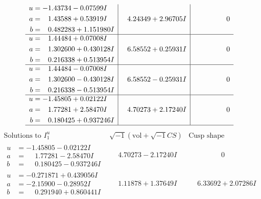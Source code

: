 \documentclass[1p]{elsarticle_modified}
\theoremstyle{definition}
\newcommand{\I}{\sqrt{-1}}
\begin{document}
$$\begin{array}{c|c|c}
\begin{aligned}
u &= -1.43734 - 0.07599 I \\
a &= \phantom{-}1.43588 + 0.53919 I \\
b &= \phantom{-}0.482283 + 1.151980 I\end{aligned}
 & \phantom{-}4.24349 + 2.96705 I & \phantom{-0.000000 } 0 \\ \hline\begin{aligned}
u &= \phantom{-}1.44484 + 0.07008 I \\
a &= \phantom{-}1.302600 + 0.430128 I \\
b &= \phantom{-}0.216338 + 0.513954 I\end{aligned}
 & \phantom{-}6.58552 + 0.25931 I & \phantom{-0.000000 } 0 \\ \hline\begin{aligned}
u &= \phantom{-}1.44484 - 0.07008 I \\
a &= \phantom{-}1.302600 - 0.430128 I \\
b &= \phantom{-}0.216338 - 0.513954 I\end{aligned}
 & \phantom{-}6.58552 - 0.25931 I & \phantom{-0.000000 } 0 \\ \hline\begin{aligned}
u &= -1.45805 + 0.02122 I \\
a &= \phantom{-}1.77281 + 2.58470 I \\
b &= \phantom{-}0.180425 + 0.937246 I\end{aligned}
 & \phantom{-}4.70273 + 2.17240 I & \phantom{-0.000000 } 0\\
 \hline 
 \end{array}$$\newpage$$\begin{array}{c|c|c}  
\text{Solutions to }I^u_{1}& \I (\text{vol} + \sqrt{-1}CS) & \text{Cusp shape}\\
 \hline 
\begin{aligned}
u &= -1.45805 - 0.02122 I \\
a &= \phantom{-}1.77281 - 2.58470 I \\
b &= \phantom{-}0.180425 - 0.937246 I\end{aligned}
 & \phantom{-}4.70273 - 2.17240 I & \phantom{-0.000000 } 0 \\ \hline\begin{aligned}
u &= -0.271871 + 0.439056 I \\
a &= -2.15900 - 0.28952 I \\
b &= \phantom{-}0.291940 + 0.860441 I\end{aligned}
 & \phantom{-}1.11878 + 1.37649 I & \phantom{-}6.33692 + 2.07286 I \\ \hline\begin{aligned}

\end{aligned}
\end{array}$$
\end{document}

